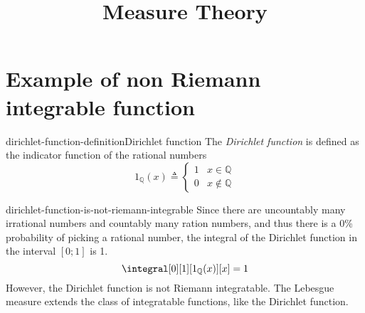 \documentclass[preview]{standalone}
\begin{document}
\title{Measure Theory}
\genpage


\section{Example of non Riemann integrable function}

\begin{snippetdefinition}{dirichlet-function-definition}{Dirichlet function}
    The \textit{Dirichlet function} is defined as the indicator function of the rational numbers
    \[
        1_{\mathbb{Q}}(x) \triangleq \begin{cases}
            1 & x \in \mathbb{Q} \\
            0 & x \notin \mathbb{Q}
        \end{cases}
    \]
\end{snippetdefinition}

\begin{snippet}{dirichlet-function-is-not-riemann-integrable}
    Since there are uncountably many irrational numbers and countably many ration numbers,
    and thus there is a 0\% probability of picking a rational number, the integral
    of the Dirichlet function in the interval \([0; 1]\) is 1.
    \[
        \integral[0][1][1_{\mathbb{Q}}(x)][x] = 1
    \]
    However, the Dirichlet function is not Riemann integratable.
    The Lebesgue measure extends the class of integratable functions, like the Dirichlet function.
\end{snippet}
\end{document}

